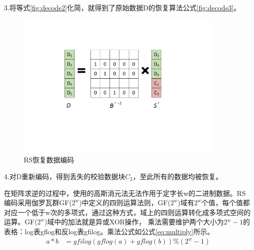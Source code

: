 3.将等式\autoref{fig:decode2}化简，就得到了原始数据D的恢复算法公式\autoref{fig:decode3}。
\begin{figure}[H]
	\centering
	\includegraphics[width=4in]{Pics/decode3.pdf}
	\caption{RS恢复数据编码}\label{fig:decode3}
\end{figure}


4.对D重新编码，得到丢失的校验数据块$C_2$，至此所有的数据均被恢复。


在矩阵求逆的过程中，使用的高斯消元法无法作用于定字长w的二进制数据。RS编码采用伽罗瓦群GF($2^w$)中定义的四则运算法则，GF($2^w$)域有$2^w$个值，每个值都对应一个低于w次的多项式，通过这种方式，域上的四则运算转化成多项式空间的运算。GF($2^w$)域中的加法就是异或XOR操作，
乘法需要维护两个大小为2$^{w}-1$的表格：log表gflog和反log表gfilog。乘法公式如公式\autoref{eq:multiply}所示。
\begin{equation}
\label{eq:multiply}
\begin{aligned}
    a * b &=gfilog(gflog(a) + gflog(b)) \% (2^w-1)
\end{aligned}
\end{equation}

